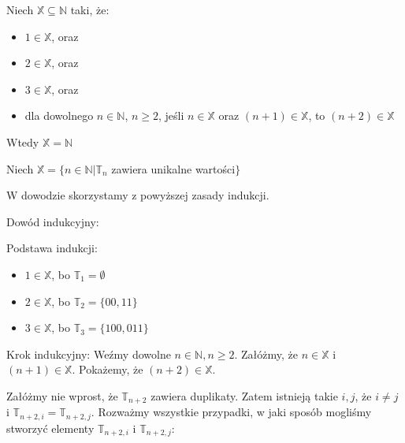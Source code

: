 Niech $\mathbb{X} \subseteq \mathbb{N}$ taki, że:
\begin{itemize}
	\item $1 \in \mathbb{X}$, oraz
	\item $2 \in \mathbb{X}$, oraz
	\item $3 \in \mathbb{X}$, oraz
	\item dla dowolnego $n \in \mathbb{N}$, $n \geq 2$, jeśli $n \in \mathbb{X}$ oraz $(n + 1) \in \mathbb{X}$, to $(n + 2) \in \mathbb{X}$
\end{itemize}
Wtedy $\mathbb{X} = \mathbb{N}$
\n

\noindent
Niech $\mathbb{X} = \{n \in \mathbb{N} | \mathbb{T}_n$ zawiera unikalne wartości$\}$
\n

\noindent
W dowodzie skorzystamy z powyższej zasady indukcji.
\n

\noindent
Dowód indukcyjny:
\n

\noindent
Podstawa indukcji:
\begin{itemize}
\item $1 \in \mathbb{X}$, bo $\mathbb{T}_1 = \emptyset$
\item $2 \in \mathbb{X}$, bo $\mathbb{T}_2 = \{00, 11\}$
\item $3 \in \mathbb{X}$, bo $\mathbb{T}_3 = \{100, 011\}$
\end{itemize}

\noindent
Krok indukcyjny:
\n
\noindent
Weźmy dowolne $n \in \mathbb{N}, n \geq 2$. Załóżmy, że $n \in \mathbb{X}$ i $(n + 1) \in \mathbb{X}$. Pokażemy, że $(n + 2) \in \mathbb{X}$.
\n

\noindent
Załóżmy nie wprost, że $\mathbb{T}_{n + 2}$ zawiera duplikaty. Zatem istnieją takie $i, j$, że $i \neq j$ i $\mathbb{T}_{n + 2, i} = \mathbb{T}_{n + 2, j}$. Rozważmy wszystkie przypadki, w jaki sposób mogliśmy stworzyć elementy $\mathbb{T}_{n + 2, i}$ i $\mathbb{T}_{n + 2, j}$:

